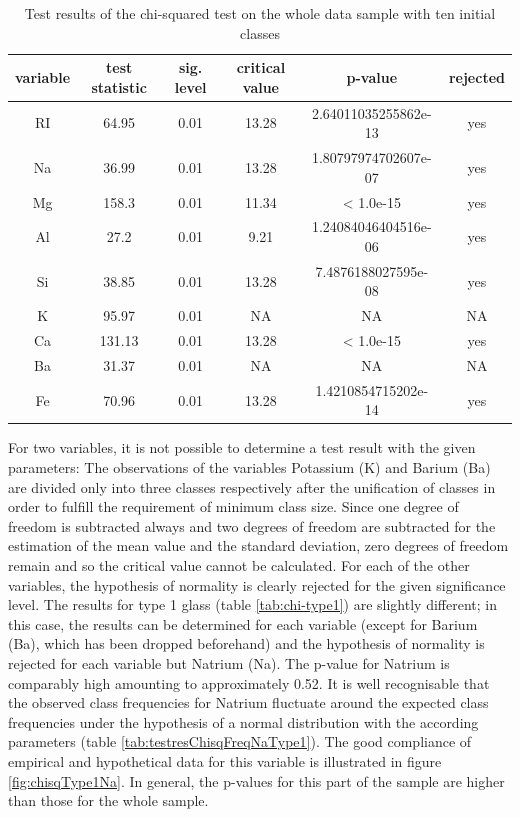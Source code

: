 \documentclass[a4paper, 12pt, titlepage, headsepline, listof = totoc, bibliography = totoc, numbers = noenddot]{scrartcl}
\begin{document}
\begin{table}[h!]
\centering
\begin{tabular}{|cccccc|} \hline variable & test statistic & sig. level & critical value & p-value & rejected\\ \hline RI & 64.95 & 0.01 & 13.28 & 2.64011035255862e-13 & yes\\ 
Na & 36.99 & 0.01 & 13.28 & 1.80797974702607e-07 & yes\\ 
Mg & 158.3 & 0.01 & 11.34 & < 1.0e-15 & yes\\ 
Al & 27.2 & 0.01 & 9.21 & 1.24084046404516e-06 & yes\\ 
Si & 38.85 & 0.01 & 13.28 & 7.4876188027595e-08 & yes\\ 
K & 95.97 & 0.01 & NA & NA & NA\\ 
Ca & 131.13 & 0.01 & 13.28 & < 1.0e-15 & yes\\ 
Ba & 31.37 & 0.01 & NA & NA & NA\\ 
Fe & 70.96 & 0.01 & 13.28 & 1.4210854715202e-14 & yes\\ \hline \end{tabular}\caption{Test results of the chi-squared test on the whole data sample with ten initial classes}
\label{tab:chi-full}
\end{table}

For two variables, it is not possible to determine a test result with the given parameters: The observations of the variables Potassium (K) and Barium (Ba) are divided only into three classes respectively after the unification of classes in order to fulfill the requirement of minimum class size. Since one degree of freedom is subtracted always and two degrees of freedom are subtracted for the estimation of the mean value and the standard deviation, zero degrees of freedom remain and so the critical value cannot be calculated. For each of the other variables, the hypothesis of normality is clearly rejected for the given significance level.
The results for type 1 glass (table \ref{tab:chi-type1}) are slightly different; in this case, the results can be determined for each variable (except for Barium (Ba), which has been dropped beforehand) and the hypothesis of normality is rejected for each variable but Natrium (Na). The p-value for Natrium is comparably high amounting to approximately 0.52. It is well recognisable that the observed class frequencies for Natrium fluctuate around the expected class frequencies under the hypothesis of a normal distribution with the according parameters (table \ref{tab:testresChisqFreqNaType1}). The good compliance of empirical and hypothetical data for this variable is illustrated in figure \ref{fig:chisqType1Na}. In general, the p-values for this part of the sample are higher than those for the whole sample.
\end{document}
